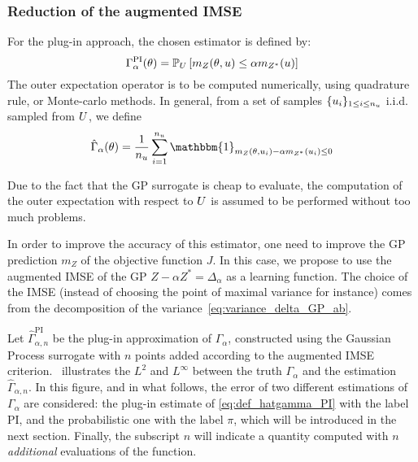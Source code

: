 \documentclass[../../Main_ManuscritThese.tex]{subfiles}
\begin{document}
\subsubsection{Reduction of the augmented IMSE}
For the plug-in approach, the chosen estimator is defined by:
\begin{equation}
  \label{eq:def_gamma_PI}
  \Gamma_{\alpha}^{\mathrm{PI}}(\theta) = \mathbb{P}_U\left[m_Z(\theta,u) \leq \alpha m_{{Z^*}}(u) \right]
\end{equation}
The outer expectation operator is to be computed numerically, using
quadrature rule, or Monte-carlo methods. In general, from a set of
samples $\{u_i\}_{1\leq i \leq n_{u}}$ i.i.d. sampled from $U$, we define
\begin{equation}
    \label{eq:def_hatgamma_PI}
  \hat{\Gamma}_{\alpha}(\kk) = \frac{1}{n_{\uu}}\sum_{i=1}^{n_{\uu}} \mathbbm{1}_{m_Z(\kk, \uu_i) - \alpha m_{Z^*}(\uu_i)\leq 0}
\end{equation}

Due to the fact that the GP surrogate is cheap to evaluate, the
computation of the outer expectation with respect to $U$ is
assumed to be performed without too much problems.

In order to improve the accuracy of this estimator, one need to
improve the GP prediction $m_Z$ of the objective function $J$.
In this case, we propose to use the augmented IMSE of the GP
$Z - \alpha Z^* = \Delta_{\alpha}$ %
as a learning function. The choice of the IMSE
(instead of choosing the point of maximal variance for instance) comes
from the decomposition of the variance~\cref{eq:variance_delta_GP_ab}.


Let $\hat{\Gamma}^{\mathrm{PI}}_{\alpha,n}$ be the plug-in
approximation of $\Gamma_\alpha$, constructed using the Gaussian
Process surrogate with $n$ points added according to the augmented
IMSE criterion.~ illustrates the $L^2$ and
$L^{\infty}$ between the truth $\Gamma_\alpha$ and the estimation
$\hat{\Gamma}_{\alpha,n}$. In this figure, and in what follows, the
error of two different estimations of $\Gamma_{\alpha}$ are
considered: the plug-in estimate of \cref{eq:def_hatgamma_PI} with the
label $\mathrm{PI}$, and the probabilistic one with the label $\pi$,
which will be introduced in the next section.  Finally, the subscript
$n$ will indicate a quantity computed with $n$ \emph{additional}
evaluations of the function.
\end{document}
